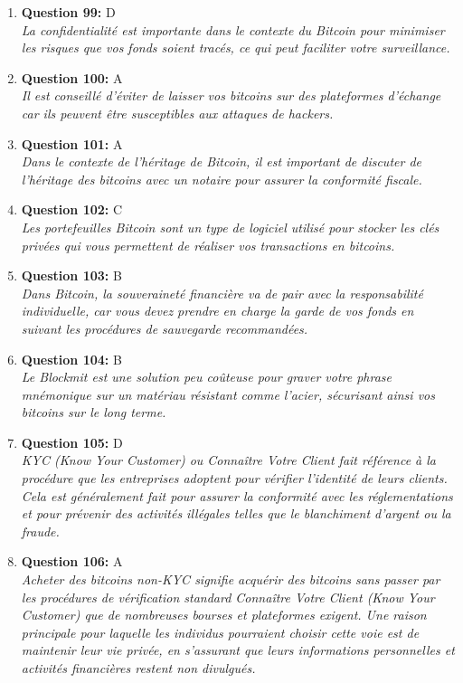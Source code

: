 \documentclass[12pt,a4paper]{article}
\begin{document}
\begin{enumerate}
\item \textbf{Question 99:} D
\\ \textit{La confidentialité est importante dans le contexte du Bitcoin pour minimiser les risques que vos fonds soient tracés, ce qui peut faciliter votre surveillance.}

\item \textbf{Question 100:} A
\\ \textit{Il est conseillé d'éviter de laisser vos bitcoins sur des plateformes d'échange car ils peuvent être susceptibles aux attaques de hackers.}

\item \textbf{Question 101:} A
\\ \textit{Dans le contexte de l'héritage de Bitcoin, il est important de discuter de l'héritage des bitcoins avec un notaire pour assurer la conformité fiscale.}

\item \textbf{Question 102:} C
\\ \textit{Les portefeuilles Bitcoin sont un type de logiciel utilisé pour stocker les clés privées qui vous permettent de réaliser vos transactions en bitcoins.}

\item \textbf{Question 103:} B
\\ \textit{Dans Bitcoin, la souveraineté financière va de pair avec la responsabilité individuelle, car vous devez prendre en charge la garde de vos fonds en suivant les procédures de sauvegarde recommandées.}

\item \textbf{Question 104:} B
\\ \textit{Le Blockmit est une solution peu coûteuse pour graver votre phrase mnémonique sur un matériau résistant comme l'acier, sécurisant ainsi vos bitcoins sur le long terme.}

\item \textbf{Question 105:} D
\\ \textit{KYC (Know Your Customer) ou Connaître Votre Client fait référence à la procédure que les entreprises adoptent pour vérifier l'identité de leurs clients. Cela est généralement fait pour assurer la conformité avec les réglementations et pour prévenir des activités illégales telles que le blanchiment d'argent ou la fraude.}

\item \textbf{Question 106:} A
\\ \textit{Acheter des bitcoins non-KYC signifie acquérir des bitcoins sans passer par les procédures de vérification standard Connaître Votre Client (Know Your Customer) que de nombreuses bourses et plateformes exigent. Une raison principale pour laquelle les individus pourraient choisir cette voie est de maintenir leur vie privée, en s'assurant que leurs informations personnelles et activités financières restent non divulgués.}


\end{enumerate}
\end{document}
